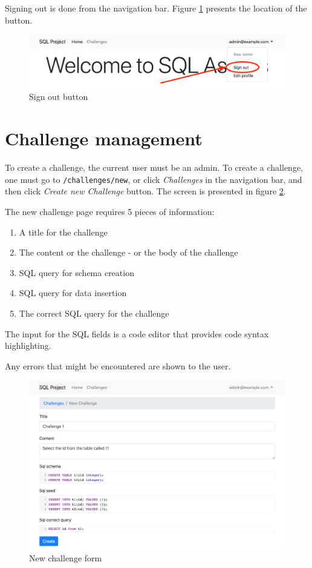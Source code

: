 Signing out is done from the navigation bar. Figure \ref{fig:app:signout} presents the location of the button.

\begin{figure}
    \centering
    \includegraphics[width=\textwidth/4*3]{Appendices/signout.png}
    \caption{Sign out button}
    \label{fig:app:signout}
\end{figure}

\section{Challenge management}
To create a challenge, the current user must be an admin. To create a challenge, one must go to \texttt{/challenges/new}, or click \textit{Challenges} in the navigation bar, and then click \textit{Create new Challenge} button. The screen is presented in figure \ref{fig:app:new_challenge}.

The new challenge page requires 5 pieces of information:
\begin{enumerate}
    \item A title for the challenge
    \item The content or the challenge - or the body of the challenge
    \item SQL query for schema creation
    \item SQL query for data insertion
    \item The correct SQL query for the challenge
\end{enumerate}

The input for the SQL fields is a code editor that provides code syntax highlighting.

Any errors that might be encountered are shown to the user.
\begin{figure}
    \centering
    \includegraphics[width=\textwidth/4*3]{Appendices/new_challenge.png}
    \caption{New challenge form}
    \label{fig:app:new_challenge}
\end{figure}

